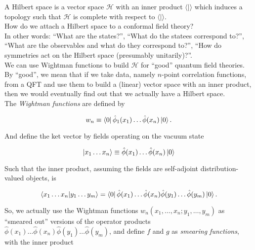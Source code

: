 
\noindent A Hilbert space is a vector space $\mathcal{H}$ with an inner product $\langle | \rangle$ which induces a topology such that $\mathcal{H}$ is complete with respect to $\langle | \rangle$. \\

\noindent How do we attach a Hilbert space to a conformal field theory? \\

\noindent In other words: ``What are the states?'', ``What do the statees correspond to?'', ``What are the observables and what do they correspond to?'', ``How do symmetries act on the Hilbert space (presumably unitarily)?''. \\

\noindent We can use Wightman functions to build $\mathcal{H}$ for ``good'' quantum field theories. By ``good'', we mean that if we take data, namely $n$-point correlation functions, from a QFT and use them to build a (linear) vector space with an inner product, then we would eventually find out that we actually have a Hilbert space. \\

\noindent The \textit{Wightman functions} are defined by

\begin{equation}
w_n \equiv \bra{0} \hat{\phi}_1 (x_1) \dots \hat{\phi} (x_n) \ket{0}.
\end{equation}

\noindent And define the ket vector by fields operating on the vacuum state

\begin{equation}
\ket{x_1 \dots x_n} \equiv \hat{\phi} (x_1) \dots \hat{\phi} (x_n) \ket{0}
\end{equation}

\noindent Such that the inner product, assuming the fields are self-adjoint distribution-valued objects, is

\begin{equation}
\braket{x_1 \dots x_n | y_1 \dots y_m } = \bra{0} \hat{\phi} (x_1) \dots \hat{\phi} (x_n)  \hat{\phi} (y_1) \dots \hat{\phi} (y_m) \ket{0}.
\end{equation}

\noindent So, we actually use the Wightman functions $w_n (x_1, \dots, x_n ; y_1, \dots, y_m)$ as ``smeared out'' versions of the operator products $\hat{\phi} (x_1) \dots \hat{\phi} (x_n)  \hat{\phi} (y_1) \dots \hat{\phi} (y_m)$, and define $f$ and $g$ as \textit{smearing functions}, with the inner product

